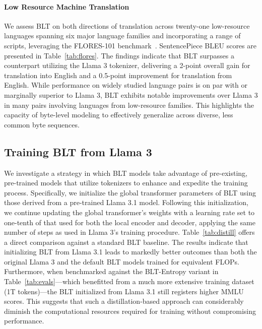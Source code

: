 \paragraph{Low Resource Machine Translation} We assess {\textsc BLT} on both directions of translation across twenty-one low-resource languages spanning six major language families and incorporating a range of scripts, leveraging the FLORES-101 benchmark~\citep{goyal2022flores}. SentencePiece BLEU scores are presented in Table~\ref{tab:flores}. The findings indicate that {\textsc BLT} surpasses a counterpart utilizing the Llama 3 tokenizer, delivering a 2-point overall gain for translation into English and a 0.5-point improvement for translation from English. While performance on widely studied language pairs is on par with or marginally superior to Llama 3, {\textsc BLT} exhibits notable improvements over Llama 3 in many pairs involving languages from low-resource families. This highlights the capacity of byte-level modeling to effectively generalize across diverse, less common byte sequences.

\subsection{Training {\textsc BLT} from Llama 3}
\label{sec:distillation}
We investigate a strategy in which {\textsc BLT} models take advantage of pre-existing, pre-trained models that utilize tokenizers to enhance and expedite the training process. Specifically, we initialize the global transformer parameters of {\textsc BLT} using those derived from a pre-trained Llama 3.1 model. Following this initialization, we continue updating the global transformer’s weights with a learning rate set to one-tenth of that used for both the local encoder and decoder, applying the same number of steps as used in Llama 3’s training procedure. Table~\ref{tab:distill} offers a direct comparison against a standard {\textsc BLT} baseline. The results indicate that initializing {\textsc BLT} from Llama 3.1 leads to markedly better outcomes than both the original Llama 3 and the default {\textsc BLT} models trained for equivalent FLOPs. Furthermore, when benchmarked against the {\textsc BLT}-Entropy variant in Table~\ref{tab:evals}—which benefitted from a much more extensive training dataset (1T tokens)—the {\textsc BLT} initialized from Llama 3.1 still registers higher MMLU scores. This suggests that such a distillation-based approach can considerably diminish the computational resources required for training without compromising performance.

